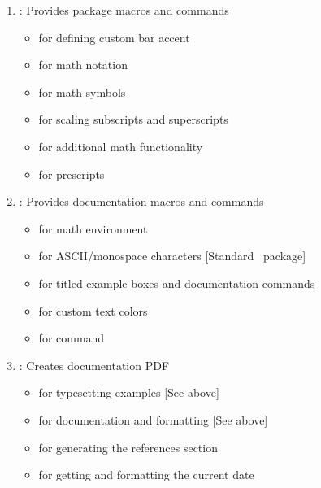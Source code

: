 \newpage

\begin{enumerate}
    \item {}: Provides package macros and commands
    \begin{itemize}[noitemsep,label={}]
        \item {} for defining custom bar accent  \cite{pack:accents}
        \item {} for math notation \cite{pack:amsmath}
        \item {} for math symbols \cite{pack:amssymb}
        \item {} for scaling subscripts and superscripts \cite{pack:graphicx}
        \item {} for additional math functionality \cite{pack:mathtools}
        \item {} for prescripts \cite{pack:tensor}
    \end{itemize}
    \item {}: Provides documentation macros and commands
    \begin{itemize}[noitemsep,label={}]
        \item {} for math  environment \cite{pack:amsmath}
        \item {} for ASCII/monospace characters [Standard \LaTeXe\ package]
        \item {} for titled example boxes and documentation commands \cite{pack:tcolorbox}
        \item {} for custom text colors \cite{pack:xcolor}
        \item {} for  command \cite{pack:xparse}
    \end{itemize}
    \item {}: Creates documentation PDF
    \begin{itemize}[noitemsep,label={}]
        \item {} for typesetting examples [See above]
        \item {} for documentation and formatting [See above]
        \item {} for generating the references section \cite{pack:biblatex}
        \item {} for getting and formatting the current date \cite{pack:datetime2}

\end{itemize}
\end{enumerate}
